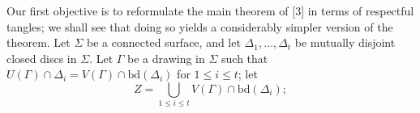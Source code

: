 
Our first objective is to reformulate the main theorem of [3] in terms of respectful tangles; we shall see that doing so yields a considerably simpler version of the theorem. Let $\Sigma$ be a connected surface, and let $\Delta_1, \dots, \Delta_t$ be mutually disjoint closed discs in $\Sigma$. Let $\Gamma$ be a drawing in $\Sigma$ such that $U(\Gamma) \cap \Delta_i = V(\Gamma) \cap \text{bd}(\Delta_i)$ for $1 \le i \le t$; let
\begin{equation*}
Z = \bigcup_{1 \le i \le t} V(\Gamma) \cap \text{bd}(\Delta_i);
\end{equation*}

